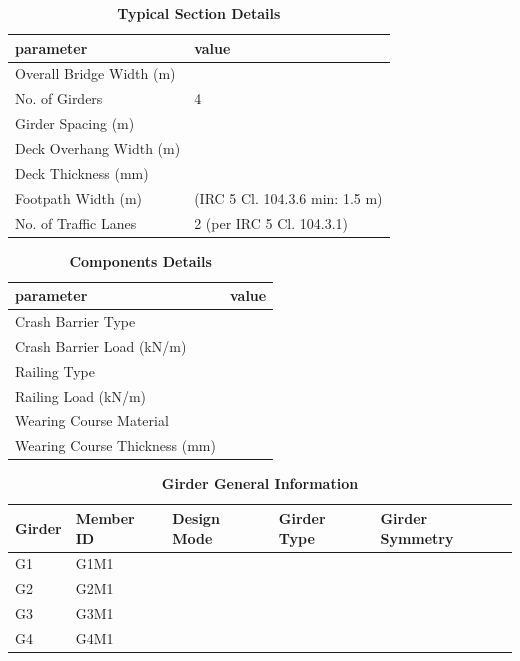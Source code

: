 \documentclass[12pt,a4paper]{report}
\numberwithin{table}{chapter}
\numberwithin{figure}{chapter}
\begin{document}
\begin{longtable}{|L{5.5cm}|p{10.0cm}|}
\caption{\textbf{Typical Section Details}}\\
\hline
\textbf{parameter} & \textbf{value} \\
\hline
\textnormal{Overall Bridge Width (m)} &  \\[6pt]
\hline
\textnormal{No. of Girders} & 4 \\[6pt]
\hline
\textnormal{Girder Spacing (m)} &  \\[6pt]
\hline
\textnormal{Deck Overhang Width (m)} &  \\[6pt]
\hline
\textnormal{Deck Thickness (mm)} &  \\[6pt]
\hline
\textnormal{Footpath Width (m)} &  (IRC 5 Cl. 104.3.6 min: 1.5 m) \\[6pt]
\hline
\textnormal{No. of Traffic Lanes} & 2 (per IRC 5 Cl. 104.3.1) \\[6pt]
\hline
\end{longtable}

\vspace{0.8em}

\begin{longtable}{|L{5.5cm}|p{10.0cm}|}
\caption{\textbf{Components Details}}\\
\hline
\textbf{parameter} & \textbf{value} \\
\hline
\textnormal{Crash Barrier Type} &  \\[6pt]
\hline
\textnormal{Crash Barrier Load (kN/m)} &  \\[6pt]
\hline

\textnormal{Railing Type} &  \\[6pt]
\hline
\textnormal{Railing Load (kN/m)} &  \\[6pt]
\hline
\textnormal{Wearing Course Material} &  \\[6pt]
\hline
\textnormal{Wearing Course Thickness (mm)} &  \\[6pt]
\hline
\end{longtable}


\newpage

\vspace{0.4em}
\noindent

\vspace{4pt}
\begin{longtable}{|L{2.2cm}|L{1.8cm}|p{3.8cm}|p{3.8cm}|p{3.8cm}|}
\caption{\textbf{Girder General Information}}\\
\hline
\textbf{Girder} & \textbf{Member ID} & \textbf{Design Mode} & \textbf{Girder Type} & \textbf{Girder Symmetry} \\[6pt]
\hline
G1 & G1M1 &  &  &  \\[8pt]
\hline
G2 & G2M1 &  &  &  \\[8pt]
\hline
G3 & G3M1 &  &  &  \\[8pt]
\hline
G4 & G4M1 &  &  &  \\[8pt]
\hline
\end{longtable}
\end{document}
